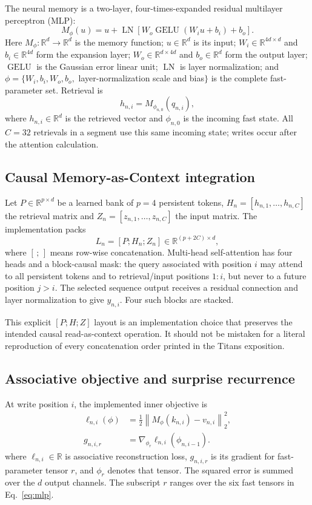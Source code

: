 \documentclass[10pt,twocolumn]{article}
\newcommand{\R}{\mathbb{R}}
\newcommand{\norm}[1]{\left\lVert#1\right\rVert}
\begin{document}
The neural memory is a two-layer, four-times-expanded residual multilayer perceptron (MLP):
\begin{equation}
M_{\phi}(u)=u+\operatorname{LN}\!\left[W_o\operatorname{GELU}(W_i u+b_i)+b_o\right].\label{eq:mlp}
\end{equation}
Here $M_{\phi}:\R^d\rightarrow\R^d$ is the memory function; $u\in\R^d$ is its input; $W_i\in\R^{4d\times d}$ and $b_i\in\R^{4d}$ form the expansion layer; $W_o\in\R^{d\times4d}$ and $b_o\in\R^d$ form the output layer; $\operatorname{GELU}$ is the Gaussian error linear unit; $\operatorname{LN}$ is layer normalization; and $\phi=\{W_i,b_i,W_o,b_o,$ layer-normalization scale and bias$\}$ is the complete fast-parameter set. Retrieval is
\begin{equation}
h_{n,i}=M_{\phi_{n,0}}(q_{n,i}),\label{eq:retrieve}
\end{equation}
where $h_{n,i}\in\R^d$ is the retrieved vector and $\phi_{n,0}$ is the incoming fast state. All $C=32$ retrievals in a segment use this same incoming state; writes occur after the attention calculation.

\subsection*{Causal Memory-as-Context integration}
Let $P\in\R^{p\times d}$ be a learned bank of $p=4$ persistent tokens, $H_n=[h_{n,1},\ldots,h_{n,C}]$ the retrieval matrix and $Z_n=[z_{n,1},\ldots,z_{n,C}]$ the input matrix. The implementation packs
\begin{equation}
L_n=[P;H_n;Z_n]\in\R^{(p+2C)\times d},\label{eq:layout}
\end{equation}
where $[\,;\,]$ means row-wise concatenation. Multi-head self-attention has four heads and a block-causal mask: the query associated with position $i$ may attend to all persistent tokens and to retrieval/input positions $1{:}i$, but never to a future position $j>i$. The selected sequence output receives a residual connection and layer normalization to give $y_{n,i}$. Four such blocks are stacked.

This explicit $[P;H;Z]$ layout is an implementation choice that preserves the intended causal read-as-context operation. It should not be mistaken for a literal reproduction of every concatenation order printed in the Titans exposition.

\subsection*{Associative objective and surprise recurrence}
At write position $i$, the implemented inner objective is
\begin{align}
\ell_{n,i}(\phi)&=\frac{1}{2}\norm{M_{\phi}(k_{n,i})-v_{n,i}}_2^2,\nonumber\\
g_{n,i,r}&=\nabla_{\phi_r}\ell_{n,i}(\phi_{n,i-1}).\label{eq:assoc}
\end{align}
where $\ell_{n,i}\in\R$ is associative reconstruction loss, $g_{n,i,r}$ is its gradient for fast-parameter tensor $r$, and $\phi_r$ denotes that tensor. The squared error is summed over the $d$ output channels. The subscript $r$ ranges over the six fast tensors in Eq.~\eqref{eq:mlp}.
\end{document}
